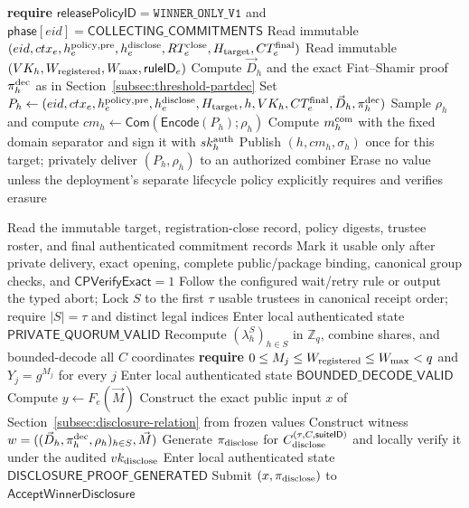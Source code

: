 \documentclass[pdflatex,sn-mathphys-num]{sn-jnl}%
\theoremstyle{thmstyleone}%
\theoremstyle{thmstyletwo}%
\theoremstyle{thmstylethree}%
\begin{document}
\begin{appendices}
\begin{algorithm}[H]
\caption{$\mathsf{CommitPrivateThresholdShare}(eid,h)$}
\label{alg:commit-private-threshold-share}
\begin{algorithmic}[1]
\State \textbf{require} $\mathsf{releasePolicyID}=\mathtt{WINNER\_ONLY\_V1}$ and $\mathsf{phase}[eid]=\mathsf{COLLECTING\_COMMITMENTS}$
\State Read immutable $(eid,ctx_e,h_e^{\rm policy,pre},h_e^{\rm disclose},RT_e^{\rm close},H_{\rm target},CT_e^{\rm final})$
\State Read immutable $(VK_h,W_{\rm registered},W_{\max},\mathsf{ruleID}_e)$
\State Compute $\vec D_h$ and the exact Fiat--Shamir proof $\pi_h^{\rm dec}$ as in Section~\ref{subsec:threshold-partdec}
\State Set $P_h\gets(eid,ctx_e,h_e^{\rm policy,pre},h_e^{\rm disclose},H_{\rm target},h,VK_h,CT_e^{\rm final},\vec D_h,\pi_h^{\rm dec})$
\State Sample $\rho_h$ and compute $cm_h\gets\mathsf{Com}(\mathsf{Encode}(P_h);\rho_h)$
\State Compute $m_h^{\rm com}$ with the fixed domain separator and sign it with $sk_h^{\rm auth}$
\State Publish $(h,cm_h,\sigma_h)$ once for this target; privately deliver $(P_h,\rho_h)$ to an authorized combiner
\State Erase no value unless the deployment's separate lifecycle policy explicitly requires and verifies erasure
\end{algorithmic}
\end{algorithm}

\begin{algorithm}[H]
\caption{$\mathsf{BuildWinnerDisclosure}(eid)$ (authorized combiner)}
\label{alg:build-winner-disclosure}
\begin{algorithmic}[1]
\State Read the immutable target, registration-close record, policy digests, trustee roster, and final authenticated commitment records
  \State Mark it usable only after private delivery, exact opening, complete public/package binding, canonical group checks, and $\mathsf{CPVerifyExact}=1$
\EndFor
{}
  \State Follow the configured wait/retry rule or output the typed abort; \Return
\EndIf
\State Lock $S$ to the first $\tau$ usable trustees in canonical receipt order; require $|S|=\tau$ and distinct legal indices
\State Enter local authenticated state $\mathsf{PRIVATE\_QUORUM\_VALID}$
\State Recompute $(\lambda_h^S)_{h\in S}$ in $\mathbb Z_q$, combine shares, and bounded-decode all $C$ coordinates
\State \textbf{require} $0\leq M_j\leq W_{\rm registered}\leq W_{\max}<q$ and $Y_j=g^{M_j}$ for every $j$
\State Enter local authenticated state $\mathsf{BOUNDED\_DECODE\_VALID}$
\State Compute $y\gets F_e(\vec M)$
\State Construct the exact public input $x$ of Section~\ref{subsec:disclosure-relation} from frozen values
\State Construct witness $w=((\vec D_h,\pi_h^{\rm dec},\rho_h)_{h\in S},\vec M)$
\State Generate $\pi_{\rm disclose}$ for $C_{\rm disclose}^{(\tau,C,\mathsf{suiteID})}$ and locally verify it under the audited $vk_{\rm disclose}$
\State Enter local authenticated state $\mathsf{DISCLOSURE\_PROOF\_GENERATED}$
\State Submit $(x,\pi_{\rm disclose})$ to $\mathsf{AcceptWinnerDisclosure}$
\end{algorithmic}
\end{algorithm}


\end{appendices}
\end{document}

